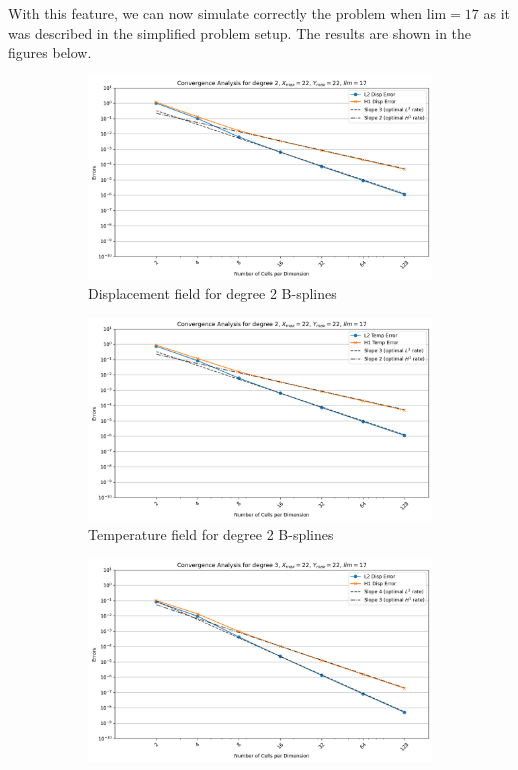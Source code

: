 \documentclass[a4paper,12pt,twoside]{report}
\begin{document}
With this feature, we can now simulate correctly the problem when $\text{lim} = 17$ as it was described in the simplified problem setup. The results are shown in the figures below.
\begin{figure}[!h]
	\begin{subfigure}[b]{0.49\textwidth}
		\includegraphics[width=\textwidth]{figures/figures_thermoelas_degree/Disp_X_max=22_Y_max=22_lim=17_d=2_disp.png}
		\caption{Displacement field for degree 2 B-splines}
		\label{fig:disp_d2_lim_17}
	\end{subfigure}
	\begin{subfigure}[b]{0.49\textwidth}
		\includegraphics[width=\textwidth]{figures/figures_thermoelas_degree/Temp_X_max=22_Y_max=22_lim=17_d=2.png}
		\caption{Temperature field for degree 2 B-splines}
		\label{fig:temp_d2_lim_17}
	\end{subfigure}
	\begin{subfigure}[b]{0.49\textwidth}
		\includegraphics[width=\textwidth]{figures/figures_thermoelas_degree/Disp_X_max=22_Y_max=22_lim=17_d=3_disp.png}

\end{subfigure}
\end{figure}
\end{document}

